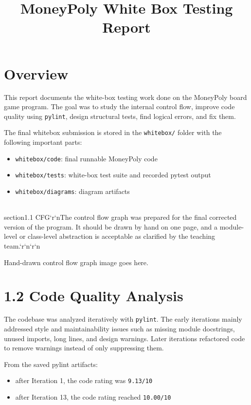\documentclass[12pt]{article}
\title{MoneyPoly White Box Testing Report}
\author{}
\date{}
\begin{document}
\maketitle

\section{Overview}
This report documents the white-box testing work done on the MoneyPoly board game program. The goal was to study the internal control flow, improve code quality using \texttt{pylint}, design structural tests, find logical errors, and fix them.

The final whitebox submission is stored in the \texttt{whitebox/} folder with the following important parts:
\begin{itemize}
\item \texttt{whitebox/code}: final runnable MoneyPoly code
\item \texttt{whitebox/tests}: white-box test suite and recorded pytest output
\item \texttt{whitebox/diagrams}: diagram artifacts
\end{itemize}

\\section{1.1 CFG}`r`nThe control flow graph was prepared for the final corrected version of the program. It should be drawn by hand on one page, and a module-level or class-level abstraction is acceptable as clarified by the teaching team.`r`n`r`n\begin{center}
\fbox{\rule{0pt}{3in}\rule{0.9\linewidth}{0pt}}

\small Hand-drawn control flow graph image goes here.
\end{center}

\section{1.2 Code Quality Analysis}
The codebase was analyzed iteratively with \texttt{pylint}. The early iterations mainly addressed style and maintainability issues such as missing module docstrings, unused imports, long lines, and design warnings. Later iterations refactored code to remove warnings instead of only suppressing them.

From the saved pylint artifacts:
\begin{itemize}
\item after Iteration 1, the code rating was \texttt{9.13/10}
\item after Iteration 13, the code rating reached \texttt{10.00/10}
\end{itemize}
\end{document}
